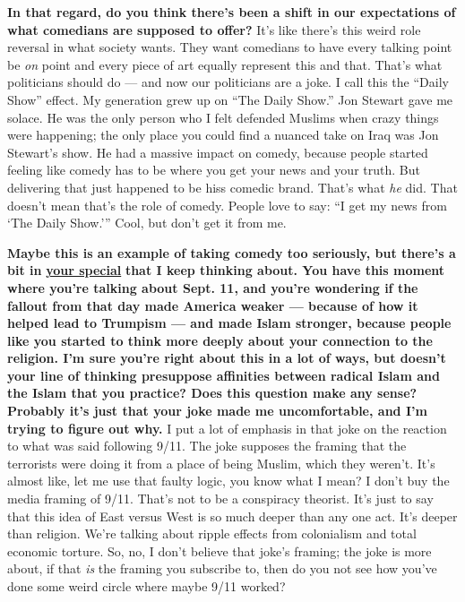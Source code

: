 \textbf{In that regard, do you think there's been a shift in our
expectations of what comedians are supposed to offer?} It's like there's
this weird role reversal in what society wants. They want comedians to
have every talking point be \emph{on} point and every piece of art
equally represent this and that. That's what politicians should do ---
and now our politicians are a joke. I call this the ``Daily Show''
effect. My generation grew up on ``The Daily Show.'' Jon Stewart gave me
solace. He was the only person who I felt defended Muslims when crazy
things were happening; the only place you could find a nuanced take on
Iraq was Jon Stewart's show. He had a massive impact on comedy, because
people started feeling like comedy has to be where you get your news and
your truth. But delivering that just happened to be hiss comedic brand.
That's what \emph{he} did. That doesn't mean that's the role of comedy.
People love to say: ``I get my news from `The Daily Show.''' Cool, but
don't get it from me.

\textbf{Maybe this is an example of taking comedy too seriously, but
there's a bit in}
\textbf{\href{http://nytimes3xbfgragh.onion\#tooltip-3}{your special}}
\textbf{that I keep thinking about. You have this moment where you're
talking about Sept. 11, and you're wondering if the fallout from that
day made America weaker --- because of how it helped lead to Trumpism
--- and made Islam stronger, because people like you started to think
more deeply about your connection to the religion. I'm sure you're right
about this in a lot of ways, but doesn't your line of thinking
presuppose affinities between radical Islam and the Islam that you
practice? Does this question make any sense? Probably it's just that
your joke made me uncomfortable, and I'm trying to figure out why.} I
put a lot of emphasis in that joke on the reaction to what was said
following 9/11. The joke supposes the framing that the terrorists were
doing it from a place of being Muslim, which they weren't. It's almost
like, let me use that faulty logic, you know what I mean? I don't buy
the media framing of 9/11. That's not to be a conspiracy theorist. It's
just to say that this idea of East versus West is so much deeper than
any one act. It's deeper than religion. We're talking about ripple
effects from colonialism and total economic torture. So, no, I don't
believe that joke's framing; the joke is more about, if that \emph{is}
the framing you subscribe to, then do you not see how you've done some
weird circle where maybe 9/11 worked?

